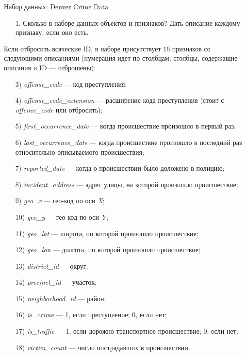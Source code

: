 Набор данных: \href{https://www.kaggle.com/datasets/paultimothymooney/denver-crime-data}{Denver Crime Data}

\begin{enumerate}
    \item[1.] Сколько в наборе данных объектов и признаков? Дать описание каждому признаку, если оно есть.
\end{enumerate}

Если отбросить всяческие ID, в наборе присутствует 16 признаков со следующими описаниями (нумерация идет по столбцам; столбцы, содержащие описания и ID --- отброшены):

\begin{enumerate}
    \item[3)] \textit{offense\_code} --- код преступления;
    \item[4)] \textit{offense\_code\_extension} --- расширение кода преступления (стоит  с \textit{offence\_code} или отбросить);
    \item[5)] \textit{first\_occurrence\_date} --- когда происшествие произошло в первый раз;
    \item[6)] \textit{last\_occurrence\_date} --- когда происшествие произошло в последний раз относительно описываемого происшествия;
    \item[7)] \textit{reported\_date} --- когда о происшествии было доложено в полицию;
    \item[8)] \textit{incident\_address} --- адрес улицы, на которой произошло происшествие;
    \item[9)] \textit{geo\_x} --- гео-код по оси \textit{X};
    \item[10)] \textit{geo\_y} --- гео-код по оси \textit{Y};
    \item[11)] \textit{geo\_lat} --- широта, по которой произошло происшествие;
    \item[12)] \textit{geo\_lon} --- долгота, по которой произошло происшествие;
    \item[13)] \textit{district\_id} --- округ;
    \item[14)] \textit{precinct\_id} --- участок;
    \item[15)] \textit{neighborhood\_id} --- район;
    \item[16)] \textit{is\_crime} --- 1, если преступление; 0, если нет;
    \item[17)] \textit{is\_traffic} --- 1, если дорожно транспортное происшествие; 0, если нет;
    \item[18)] \textit{victim\_count} --- число пострадавших в происшествии.
\end{enumerate}

